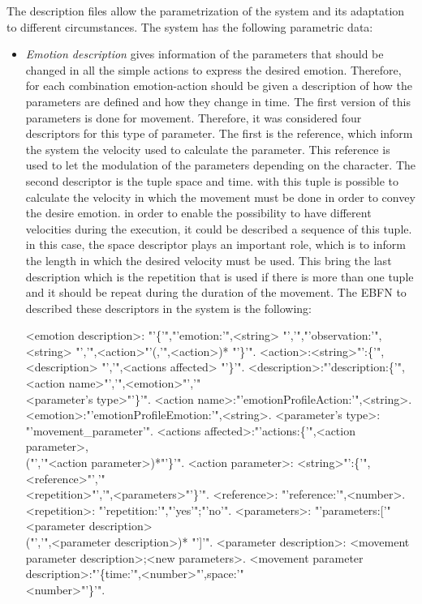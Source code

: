 The description files allow the parametrization of the system and its adaptation to different circumstances.  The system has the following parametric data:

\begin{itemize}

	\item \textit{Emotion description} gives information of the parameters that should be changed in all the simple actions to express the desired emotion. Therefore, for each combination emotion-action should be given a description of how the parameters are defined and how they change in time. 
The first version of this parameters is done for movement. Therefore, it was considered four descriptors for this type of parameter. The first is the reference, which inform the system the velocity used to calculate the parameter. This reference is used to let the modulation of the parameters depending on the character. The second descriptor is the tuple space and time. with this tuple is possible to calculate the velocity in which the movement must be done in order to convey the desire emotion. in order to enable the possibility to have different velocities during the execution, it could be described a sequence of this tuple. in this case, the space descriptor plays an important role, which is to inform the length in which the desired velocity must be used. This bring the last description which is the repetition that is used if there is more than one tuple and it should be repeat during the duration of the movement. The EBFN to described these descriptors in the system is the following: 
\begin{grammar}
<emotion description>: "'\{'","'emotion:'",<string> "','","'observation:'",<string> "','",<action>"'(,'",<action>)* "'\}'".
<action>:<string>"':\{'",<description> "','",<actions affected> "'\}'".
<description>:"'description:\{'",<action name>"','",<emotion>"','"\\
<parameter's type>"'\}'".
<action name>:"'emotionProfileAction:'",<string>.
<emotion>:"'emotionProfileEmotion:'",<string>.
<parameter's type>: "'movement\_parameter'".
<actions affected>:"'actions:\{'",<action parameter>,\\("','"<action parameter>)*"'\}'".
<action parameter>: <string>"':\{'",<reference>"','"\\<repetition>"','",<parameters>"'\}'".
<reference>: "'reference:'",<number>.
<repetition>: "'repetition:'","'yes'";"'no'".
<parameters>: "'parameters:['" <parameter description>\\("','",<parameter description>)* "']'".
<parameter description>: <movement parameter description>;<new parameters>.
<movement parameter description>:"'\{time:'",<number>"',space:'"\\<number>"'\}'".
\end{grammar}


\end{itemize}
